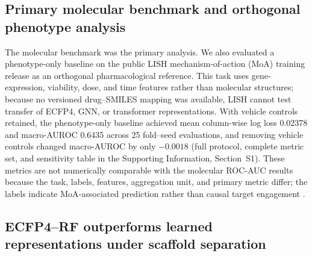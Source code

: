 \documentclass[11pt,a4paper]{article}
\begin{document}
\subsection{Primary molecular benchmark and orthogonal phenotype analysis}

The molecular benchmark was the primary analysis. We also evaluated a phenotype-only baseline on the public LISH mechanism-of-action (MoA) training release as an orthogonal pharmacological reference. This task uses gene-expression, viability, dose, and time features rather than molecular structures; because no versioned drug--SMILES mapping was available, LISH cannot test transfer of ECFP4, GNN, or transformer representations. With vehicle controls retained, the phenotype-only baseline achieved mean column-wise log loss \num{0.02378} and macro-AUROC \num{0.6435} across \num{25} fold--seed evaluations, and removing vehicle controls changed macro-AUROC by only $-\num{0.0018}$ (full protocol, complete metric set, and sensitivity table in the Supporting Information, Section~S1). These metrics are not numerically comparable with the molecular ROC-AUC results because the task, labels, features, aggregation unit, and primary metric differ; the labels indicate MoA-associated prediction rather than causal target engagement \citep{Trapotsi2022MoA}.

\subsection{ECFP4--RF outperforms learned representations under scaffold separation}



\end{document}
